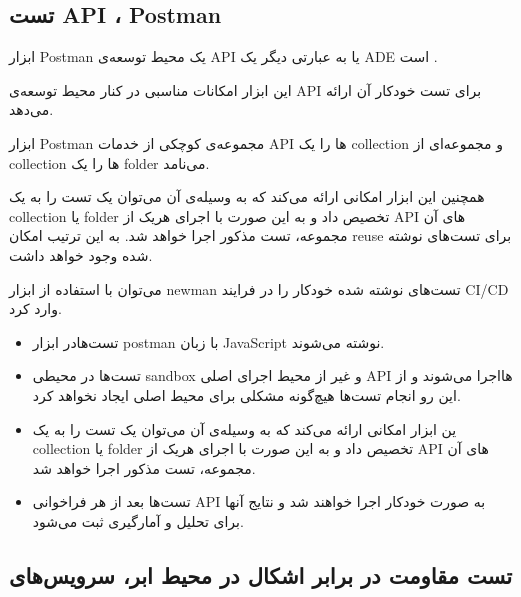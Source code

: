 



\subsection{تست API ، Postman}
ابزار Postman
یک محیط توسعه‌ی API یا به عبارتی دیگر یک ADE است
.

این ابزار امکانات مناسبی در کنار محیط توسعه‌ی API برای تست خودکار آن ارائه می‌دهد.

ابزار Postman مجموعه‌ی کوچکی از خدمات API ها را یک collection و مجموعه‌ای  از collection ها را یک folder می‌نامد.

همچنین این ابزار امکانی ارائه می‌کند که به وسیله‌ی آن می‌توان یک تست را به یک collection یا folder تخصیص داد و به این صورت با اجرای هر‌یک از API  های آن مجموعه، تست مذکور اجرا خواهد شد.
به این ترتیب امکان reuse برای تست‌های نوشته شده وجود خواهد داشت.

می‌توان با استفاده از ابزار newman تست‌های نوشته شده خودکار را در فرایند CI/CD وارد کرد.

\begin{itemize}
\item
تست‌هادر ابزار postman با زبان JavaScript نوشته می‌شوند.

\item
تست‌ها در محیطی sandbox و غیر از محیط اجرای اصلی API هااجرا می‌شوند و از این رو انجام تست‌ها هیچ‌گونه مشکلی برای محیط اصلی ایجاد نخواهد کرد.
\item ین ابزار امکانی ارائه می‌کند که به وسیله‌ی آن می‌توان یک تست را به یک collection یا folder تخصیص داد و به این صورت با اجرای هر‌یک از API  های آن مجموعه، تست مذکور اجرا خواهد شد.
\item 
تست‌ها بعد از هر فراخوانی API به صورت خودکار اجرا خواهند شد و نتایج آنها برای تحلیل و آمارگیری ثبت می‌شود.
\end{itemize}



\subsection{تست مقاومت در برابر اشکال در محیط ابر، سرویس‌های }

